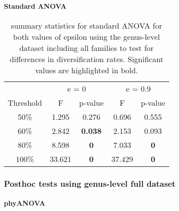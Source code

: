 \documentclass[]{article}
\let\oldparagraph\paragraph
\renewcommand{\paragraph}[1]{\oldparagraph{#1}\mbox{}}
\begin{document}
\hypertarget{standard-anova-6}{%
\paragraph{Standard ANOVA}\label{standard-anova-6}}

\begin{table}[H]

\caption{\label{tab:unnamed-chunk-31}summary statistics for standard ANOVA for both values of epsilon using the genus-level dataset including all families to test for differences in diversification rates. Significant values are highlighted in bold.}
\centering
\begin{tabular}{c|c|c|c|c}
\hline
\multicolumn{1}{c|}{ } & \multicolumn{2}{c|}{e = 0} & \multicolumn{2}{c}{e = 0.9} \\
\cline{2-3} \cline{4-5}
Threshold & F & p-value & F & p-value\\
\hline
50\% & 1.295 & 0.276 & 0.696 & 0.555\\
\hline
60\% & 2.842 & \textbf{0.038} & 2.153 & 0.093\\
\hline
80\% & 8.598 & \textbf{0} & 7.033 & \textbf{0}\\
\hline
100\% & 33.621 & \textbf{0} & 37.429 & \textbf{0}\\
\hline
\end{tabular}
\end{table}

\hypertarget{posthoc-tests-using-genus-level-full-dataset}{%
\subsubsection{Posthoc tests using genus-level full
dataset}\label{posthoc-tests-using-genus-level-full-dataset}}

\hypertarget{phyanova-7}{%
\paragraph{phyANOVA}\label{phyanova-7}}
\end{document}
